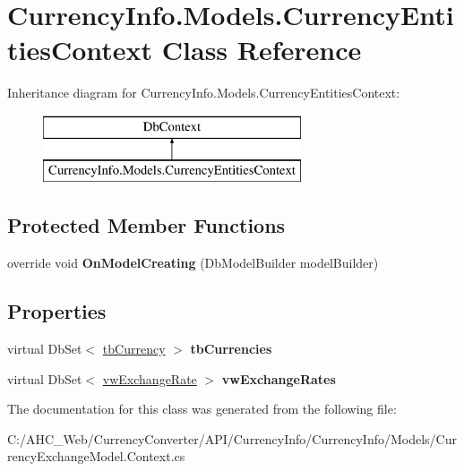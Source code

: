 \hypertarget{class_currency_info_1_1_models_1_1_currency_entities_context}{\section{Currency\-Info.\-Models.\-Currency\-Entities\-Context Class Reference}
\label{class_currency_info_1_1_models_1_1_currency_entities_context}
}
Inheritance diagram for Currency\-Info.\-Models.\-Currency\-Entities\-Context\-:\begin{figure}[H]
\begin{center}
\leavevmode
\includegraphics[height=2.000000cm]{class_currency_info_1_1_models_1_1_currency_entities_context}
\end{center}
\end{figure}
\subsection*{Protected Member Functions}
\begin{DoxyCompactItemize}
\item 
\hypertarget{class_currency_info_1_1_models_1_1_currency_entities_context_ae9035331a77b20bfd9ce39bffc37ad8e}{override void {\bfseries On\-Model\-Creating} (Db\-Model\-Builder model\-Builder)}\label{class_currency_info_1_1_models_1_1_currency_entities_context_ae9035331a77b20bfd9ce39bffc37ad8e}

\end{DoxyCompactItemize}
\subsection*{Properties}
\begin{DoxyCompactItemize}
\item 
\hypertarget{class_currency_info_1_1_models_1_1_currency_entities_context_aa747b157d8dd6ac18368f89b506c42a9}{virtual Db\-Set$<$ \hyperlink{class_currency_info_1_1_models_1_1tb_currency}{tb\-Currency} $>$ {\bfseries tb\-Currencies}}\label{class_currency_info_1_1_models_1_1_currency_entities_context_aa747b157d8dd6ac18368f89b506c42a9}

\item 
\hypertarget{class_currency_info_1_1_models_1_1_currency_entities_context_acc2d9eb611925c9ddb46f4134d1ce0d2}{virtual Db\-Set$<$ \hyperlink{class_currency_info_1_1_models_1_1vw_exchange_rate}{vw\-Exchange\-Rate} $>$ {\bfseries vw\-Exchange\-Rates}}\label{class_currency_info_1_1_models_1_1_currency_entities_context_acc2d9eb611925c9ddb46f4134d1ce0d2}

\end{DoxyCompactItemize}


The documentation for this class was generated from the following file\-:\begin{DoxyCompactItemize}
\item 
C\-:/\-A\-H\-C\-\_\-\-Web/\-Currency\-Converter/\-A\-P\-I/\-Currency\-Info/\-Currency\-Info/\-Models/Currency\-Exchange\-Model.\-Context.\-cs\end{DoxyCompactItemize}
